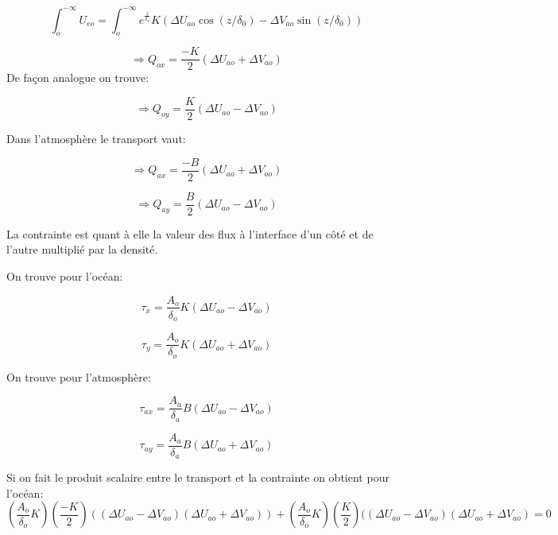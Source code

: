 \documentclass[11pt,a4paper,titlepage]{article}
\begin{document}
\begin{equation}
 \int_{o}^{-\infty} U_{eo} = \int_{o}^{-\infty} e^{\frac{z}{\delta_o}} K (\Delta U_{ao} \cos(z/\delta_0) -\Delta V_{ao} \sin(z/\delta_0))
\end{equation}

\begin{equation}
\Rightarrow Q_{ox} =  \dfrac{-K}{2}(\Delta U_{ao} + \Delta V_{ao})
\end{equation}
De façon analogue on trouve:

\begin{equation}
\Rightarrow Q_{oy} =   \dfrac{K}{2}(\Delta U_{ao} - \Delta V_{ao})
\end{equation}

Dans l'atmosphère le transport vaut:

\begin{equation}
\Rightarrow Q_{ax} =   \dfrac{-B}{2}(\Delta U_{ao} + \Delta V_{ao})
\end{equation}

\begin{equation}
\Rightarrow Q_{ay} =   \dfrac{B}{2}(\Delta U_{ao} - \Delta V_{ao})
\end{equation}

La contrainte est quant à elle la valeur des flux à l'interface d'un côté et de l'autre multiplié par la densité.

On trouve pour l'océan: 

\begin{equation}
\tau_x = \dfrac{A_o}{\delta_o}  K (\Delta U_{ao} - \Delta V_{ao}) 
\end{equation}

\begin{equation}
\tau_y = \dfrac{A_o}{\delta_o} K (\Delta U_{ao} +\Delta V_{ao})
\end{equation}

\pagebreak

On trouve pour l'atmosphère: 

\begin{equation}
\tau_{ax} = \dfrac{A_a}{\delta_a} B (\Delta U_{ao} - \Delta V_{ao}  ) 
\end{equation}

\begin{equation}
\tau_{ay} = \dfrac{A_a}{\delta_a}  B (\Delta U_{ao} + \Delta V_{ao})
\end{equation}

Si on fait le produit scalaire entre le transport et la contrainte on obtient pour l'océan:
\begin{equation}
(\dfrac{A_o}{\delta_o}  K) \left(\dfrac{-K}{2}\right) ((\Delta U_{ao} - \Delta V_{ao})(\Delta U_{ao} + \Delta V_{ao}) )+\left(\dfrac{A_o}{\delta_o} K\right)\left(\dfrac{K}{2}\right)((\Delta U_{ao} - \Delta V_{ao})(\Delta U_{ao} +\Delta V_{ao}) = 0
\end{equation}
\end{document}

